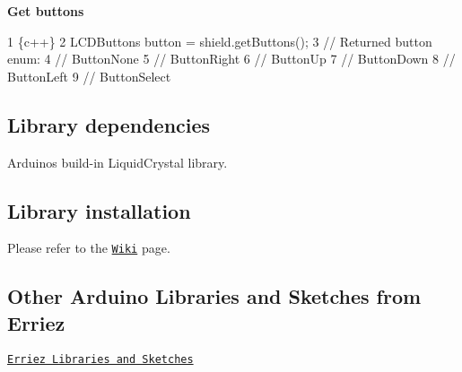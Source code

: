 {\bfseries Get buttons}


\begin{DoxyCode}
1 \{c++\}
2 LCDButtons button = shield.getButtons();
3 // Returned button enum:
4 //   ButtonNone
5 //   ButtonRight
6 //   ButtonUp
7 //   ButtonDown
8 //   ButtonLeft
9 //   ButtonSelect
\end{DoxyCode}


\subsection*{Library dependencies}


\begin{DoxyItemize}
\item Arduino\textquotesingle{}s build-\/in {\ttfamily Liquid\+Crystal} library.
\end{DoxyItemize}

\subsection*{Library installation}

Please refer to the \href{https://github.com/Erriez/ErriezArduinoLibrariesAndSketches/wiki}{\tt Wiki} page.

\subsection*{Other Arduino Libraries and Sketches from Erriez}


\begin{DoxyItemize}
\item \href{https://github.com/Erriez/ErriezArduinoLibrariesAndSketches}{\tt Erriez Libraries and Sketches} 
\end{DoxyItemize}